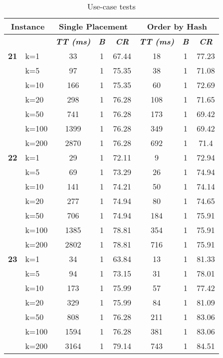     \begin{table}[htbp]
    \caption{Use-case tests}
    \centering
    \begin{tabular}{|l|l|c|c|c|c|c|c|}
    
    \multicolumn{ 2}{|c|}{\textbf{Instance}} & \multicolumn{ 3}{c|}{\textbf{Single Placement}} & \multicolumn{ 3}{c|}{\textbf{Order by Hash}} \\ \hline
    \multicolumn{ 2}{|l|}{} & \textbf{\textit{TT (ms)}} & \textbf{\textit{B}} & \textbf{\textit{CR}} & \textbf{\textit{TT (ms)}} & \textbf{\textit{B}} & \textbf{\textit{CR}} \\ \hline
    \multicolumn{1}{|r|}{\textbf{21}} & k=1 & 33 & 1 & 67.44 & 18 & 1 & 77.23 \\ 
     & k=5 & 97 & 1 & 75.35 & 38 & 1 & 71.08 \\ 
     & k=10 & 166 & 1 & 75.35 & 60 & 1 & 72.69 \\ 
     & k=20 & 298 & 1 & 76.28 & 108 & 1 & 71.65 \\ 
     & k=50 & 741 & 1 & 76.28 & 173 & 1 & 69.42 \\ 
     & k=100 & 1399 & 1 & 76.28 & 349 & 1 & 69.42 \\ 
     & k=200 & 2870 & 1 & 76.28 & 692 & 1 & 71.4 \\ \hline
    \multicolumn{1}{|r|}{\textbf{22}} & k=1 & 29 & 1 & 72.11 & 9 & 1 & 72.94 \\ 
     & k=5 & 69 & 1 & 73.29 & 26 & 1 & 74.94 \\ 
     & k=10 & 141 & 1 & 74.21 & 50 & 1 & 74.14 \\ 
     & k=20 & 277 & 1 & 74.94 & 80 & 1 & 74.65 \\ 
     & k=50 & 706 & 1 & 74.94 & 184 & 1 & 75.91 \\ 
     & k=100 & 1385 & 1 & 78.81 & 354 & 1 & 75.91 \\ 
     & k=200 & 2802 & 1 & 78.81 & 716 & 1 & 75.91 \\ \hline
    \multicolumn{1}{|r|}{\textbf{23}} & k=1 & 34 & 1 & 63.84 & 13 & 1 & 81.33 \\ 
     & k=5 & 94 & 1 & 73.15 & 31 & 1 & 78.01 \\ 
     & k=10 & 173 & 1 & 75.99 & 57 & 1 & 77.42 \\ 
     & k=20 & 329 & 1 & 75.99 & 84 & 1 & 81.09 \\ 
     & k=50 & 808 & 1 & 76.28 & 211 & 1 & 83.06 \\ 
     & k=100 & 1594 & 1 & 76.28 & 381 & 1 & 83.06 \\ 
     & k=200 & 3164 & 1 & 79.14 & 743 & 1 & 84.51 \\ \hline

\end{tabular}
\end{table}
